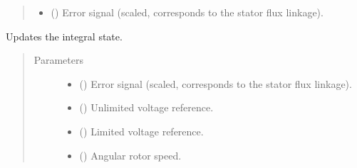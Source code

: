 \documentclass[letterpaper,10pt,english]{sphinxmanual}
\begin{document}
\begin{fulllineitems}
\begin{fulllineitems}
\begin{quote}
\begin{description}
\begin{itemize}
\item {} 
\sphinxAtStartPar
{} () \textendash{} Error signal (scaled, corresponds to the stator flux linkage).

\end{itemize}


\end{description}\end{quote}

\end{fulllineitems}


\begin{fulllineitems}
\label{\detokenize{control.sm:control.sm.vector.CurrentCtrl.update}}
\pysigstartsignatures
{}
\pysigstopsignatures
\sphinxAtStartPar
Updates the integral state.
\begin{quote}\begin{description}
\item[{Parameters}] \leavevmode\begin{itemize}
\item {} 
\sphinxAtStartPar
{} () \textendash{} Error signal (scaled, corresponds to the stator flux linkage).

\item {} 
\sphinxAtStartPar
{} () \textendash{} Unlimited voltage reference.

\item {} 
\sphinxAtStartPar
{} () \textendash{} Limited voltage reference.

\item {} 
\sphinxAtStartPar
{} () \textendash{} Angular rotor speed.

\end{itemize}

\end{description}\end{quote}

\end{fulllineitems}


\end{fulllineitems}
\end{document}
